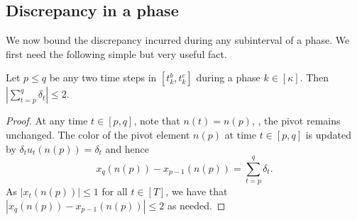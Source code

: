 \documentclass{toc}
\begin{document}
\subsection{Discrepancy in a phase}
We now bound the discrepancy incurred during any subinterval of a phase. We first need the following simple but very useful fact.
\begin{lemma}
\label{lem:sumofdelta}
Let $p \le q$ be any two time steps in $[t^b_k, t^e_k]$ during a phase $k \in [\kappa]$.
Then $ \left|\sum_{t=p}^{q} \delta_{t}\right| \le 2$.
\end{lemma}
\begin{proof}
At any time $t \in [p,q]$, note that $n(t) = n(p)$, \ie, the pivot remains
unchanged. The color of the pivot element $n(p)$ at time $t \in [p,q]$ is
updated by $\delta_t u_t(n(p)) = \delta_t$ and hence
\[
  x_{q}(n(p)) - x_{p-1}(n(p)) = \sum_{t=p}^{q} \delta_{t}.
\]
As $|x_t(n(p))| \le 1$ for all $t \in [T]$, we have that $|x_{q}(n(p)) -
x_{p-1}(n(p))| \le 2$ as needed.
\end{proof}
\end{document}
